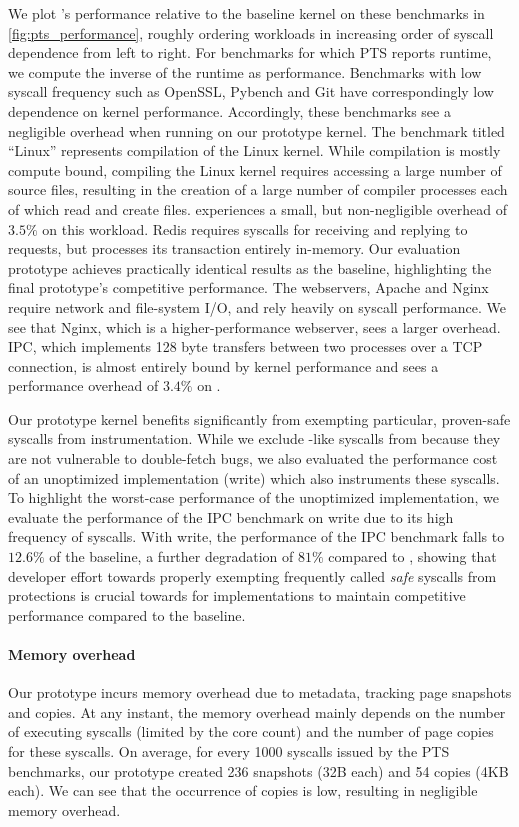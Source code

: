 \documentclass[letterpaper,twocolumn,10pt]{article}
\begin{document}
We plot \tiktok's performance relative to the baseline kernel on
these benchmarks in \autoref{fig:pts_performance}, roughly ordering 
workloads in increasing order of syscall dependence from left to right.
For benchmarks for which PTS reports runtime, we compute the inverse 
of the runtime as performance.
Benchmarks with low syscall frequency such as OpenSSL, 
Pybench and Git have correspondingly low dependence on kernel performance.
Accordingly, these benchmarks see a negligible overhead when running 
on our prototype kernel.
The benchmark titled ``Linux'' represents compilation of the Linux kernel.
While compilation is mostly compute bound, compiling the Linux kernel requires 
accessing a large number of source files, resulting in the creation 
of a large number of compiler processes each of which read and create 
files. 
\tiktok experiences a small, but non-negligible overhead of $3.5\%$ on this workload.
Redis requires syscalls for receiving and replying to requests, but 
processes its transaction entirely in-memory. 
Our evaluation prototype achieves practically identical results as the baseline, 
highlighting the final prototype's competitive performance.
The webservers, Apache and Nginx require network and file-system I/O, 
and rely heavily on syscall performance. 
We see that Nginx, which is a higher-performance webserver, sees a larger
overhead.
IPC, which implements 128 byte transfers between 
two processes over a TCP connection, is almost entirely bound by kernel 
performance and sees a performance overhead of $3.4\%$ on \tiktok.

Our prototype \tiktok kernel benefits significantly from 
exempting particular, proven-safe syscalls from instrumentation.
While we exclude -like syscalls from \tiktok because they 
are not vulnerable to double-fetch bugs, we also evaluated the
performance cost of an unoptimized implementation (\tiktok{+}write)
which also instruments these syscalls.
To highlight the worst-case performance of the unoptimized implementation, 
we evaluate the performance of the IPC benchmark on \tiktok{+}write due 
to its high frequency of  syscalls.
With \tiktok{+}write, the performance of the IPC benchmark falls to 
$12.6\%$ of the baseline, a further degradation of $81\%$ compared 
to \tiktok, showing that developer effort towards properly exempting 
frequently called \emph{safe} syscalls from \tiktok protections is crucial
towards for implementations to maintain competitive performance
compared to the baseline.

\paragraph{Memory overhead}
Our prototype incurs memory overhead due to metadata, tracking page snapshots
and copies. 
At any instant, the memory overhead mainly depends on the number of executing 
syscalls (limited by the core count) and the number of page copies for these 
syscalls.
On average, for every 1000 syscalls issued by the PTS benchmarks, our prototype
created 236 snapshots (32B each) and 54 copies (4KB each).
We can see that the occurrence of copies is low, resulting in negligible 
memory overhead.
\end{document}
